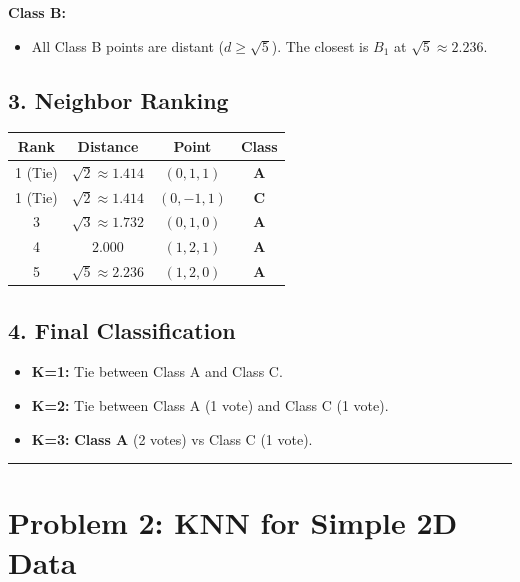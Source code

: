 \documentclass[11pt]{article}
\begin{document}
\textbf{Class B:}
\begin{itemize}
  \item All Class B points are distant ($d \ge \sqrt{5}$). The closest is $B_1$ at $\sqrt{5} \approx 2.236$.
\end{itemize}

\subsection*{3. Neighbor Ranking}
\begin{table}[h]
  \centering
  \begin{tabular}{c c c c}
    \toprule
    \textbf{Rank} & \textbf{Distance} & \textbf{Point} & \textbf{Class} \\
    \midrule
    1 (Tie) & $\sqrt{2} \approx 1.414$ & $(0,1,1)$ & \textbf{A} \\
    1 (Tie) & $\sqrt{2} \approx 1.414$ & $(0,-1,1)$ & \textbf{C} \\
    3 & $\sqrt{3} \approx 1.732$ & $(0,1,0)$ & \textbf{A} \\
    4 & $2.000$ & $(1,2,1)$ & \textbf{A} \\
    5 & $\sqrt{5} \approx 2.236$ & $(1,2,0)$ & \textbf{A} \\
    \bottomrule
  \end{tabular}
\end{table}

\subsection*{4. Final Classification}
\begin{itemize}
  \item \textbf{K=1:} Tie between Class A and Class C.
  \item \textbf{K=2:} Tie between Class A (1 vote) and Class C (1 vote).
  \item \textbf{K=3:} \textbf{Class A} (2 votes) vs Class C (1 vote).
\end{itemize}

\vspace{0.5cm}
\hrule
\vspace{0.5cm}

\section*{Problem 2: KNN for Simple 2D Data}
\end{document}
